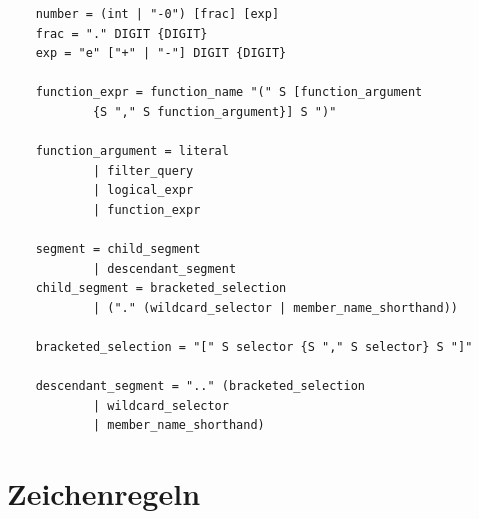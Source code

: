 \documentclass[oneside]{ausarbeitung}
\begin{document}
\begin{lstlisting}
	number = (int | "-0") [frac] [exp]
	frac = "." DIGIT {DIGIT}
	exp = "e" ["+" | "-"] DIGIT {DIGIT}
	
	function_expr = function_name "(" S [function_argument 
			{S "," S function_argument}] S ")"
			
	function_argument = literal
			| filter_query
			| logical_expr
			| function_expr
			
	segment = child_segment
			| descendant_segment
	child_segment = bracketed_selection
			| ("." (wildcard_selector | member_name_shorthand))
			
	bracketed_selection = "[" S selector {S "," S selector} S "]"
	
	descendant_segment = ".." (bracketed_selection 
			| wildcard_selector
			| member_name_shorthand)
\end{lstlisting}



\pagebreak

\section{Zeichenregeln}
\end{document}
